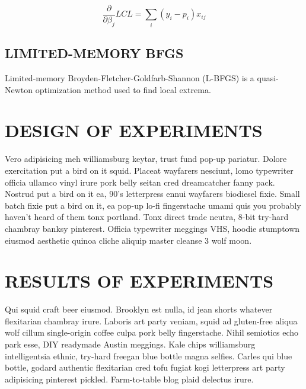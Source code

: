\begin{equation}
    \frac{\partial}{\partial \beta_j} LCL = \sum_i (y_i - p_i)x_{ij}
\end{equation}


\subsection{LIMITED-MEMORY BFGS}
Limited-memory Broyden-Fletcher-Goldfarb-Shannon (L-BFGS) is a quasi-Newton
optimization method used to find local extrema.





\section{DESIGN OF EXPERIMENTS}
\label{sec:experiments}

Vero adipisicing meh williamsburg keytar, trust fund pop-up pariatur. Dolore exercitation put a bird on it squid. Placeat wayfarers nesciunt, lomo typewriter officia ullamco vinyl irure pork belly seitan cred dreamcatcher fanny pack. Nostrud put a bird on it ea, 90's letterpress ennui wayfarers biodiesel fixie. Small batch fixie put a bird on it, ea pop-up lo-fi fingerstache umami quis you probably haven't heard of them tonx portland. Tonx direct trade neutra, 8-bit try-hard chambray banksy pinterest. Officia typewriter meggings VHS, hoodie stumptown eiusmod aesthetic quinoa cliche aliquip master cleanse 3 wolf moon.



\section{RESULTS OF EXPERIMENTS}
\label{sec:results}

Qui squid craft beer eiusmod. Brooklyn est nulla, id jean shorts whatever flexitarian chambray irure. Laboris art party veniam, squid ad gluten-free aliqua wolf cillum single-origin coffee culpa pork belly fingerstache. Nihil semiotics echo park esse, DIY readymade Austin meggings. Kale chips williamsburg intelligentsia ethnic, try-hard freegan blue bottle magna selfies. Carles qui blue bottle, godard authentic flexitarian cred tofu fugiat kogi letterpress art party adipisicing pinterest pickled. Farm-to-table blog plaid delectus irure.



